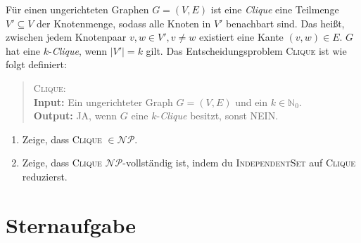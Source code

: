 \documentclass{uebung_cs}
\begin{document}
\begin{aufgabe}[Clique]
	Für einen ungerichteten Graphen $G = (V,E)$  ist eine \textit{Clique} eine Teilmenge $V' \subseteq V$ der Knotenmenge, sodass alle Knoten in $V'$ benachbart sind. Das heißt, zwischen jedem Knotenpaar $v,w \in V', v \neq w$ existiert eine Kante $(v,w) \in E$. $G$ hat eine $k$-\textit{Clique}, wenn $|V'| = k$ gilt. Das Entscheidungsproblem \textsc{Clique} ist wie folgt definiert:
	\begin{quote}
		\textsc{Clique}:\\
		\textbf{Input:} Ein ungerichteter Graph $G = (V,E)$ und ein $k \in \mathbb{N}_0$.\\
		\textbf{Output:} \glqq JA\grqq{}, wenn $G$ eine $k$-\textit{Clique} besitzt, sonst \glqq NEIN\grqq{}.
	\end{quote}
	\begin{enumerate}
		\item Zeige, dass \textsc{Clique} $\in \mathcal{NP}$.\\
		\item Zeige, dass \textsc{Clique} $\mathcal{NP}$-vollständig ist, indem du \textsc{IndependentSet} auf \textsc{Clique} reduzierst.
	\end{enumerate}
\end{aufgabe}

\section*{Sternaufgabe}

\begin{aufgabe}
	
\end{aufgabe}
\end{document}
